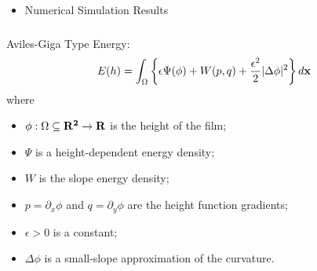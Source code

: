 \documentclass[amstex]{beamer}
\newcommand{\wuhao}{\fontsize{10.5pt}{\baselineskip}\selectfont}    %
\begin{document}
\begin{CJK*}{GBK}{kai}
\begin{frame}
\begin{itemize}
 		\item \textcolor{orange!10}{Numerical Simulation Results}
 	\end{itemize}
 \end{frame}
 \begin{frame}
 \frametitle{\wuhao{\bf Aviles-Giga Type Energy}}
Aviles-Giga Type Energy:
\begin{equation*}\label{energy}
E(h) = \int_\Omega\left\{\epsilon\Psi(\phi) +W(p,q) +      \frac{\epsilon^2}{2}|\Delta \phi|^2 \right\}d{\bf x}
\end{equation*} 
where
\begin{itemize}
\item $ \phi:\Omega \subseteq {\bf R^2}\rightarrow {\bf R}$ is the height of the film;
\item $\Psi$ is a height-dependent energy density; 
\item $W$ is the slope energy density; 
\item $p = \partial_x \phi$ and $q = \partial_y \phi$ are the height function gradients; 
\item $\epsilon >0$ is a constant; 
\item $\Delta \phi$ is a small-slope approximation of the curvature. 
\end{itemize}
\end{frame}


\end{CJK*}
\end{document}
